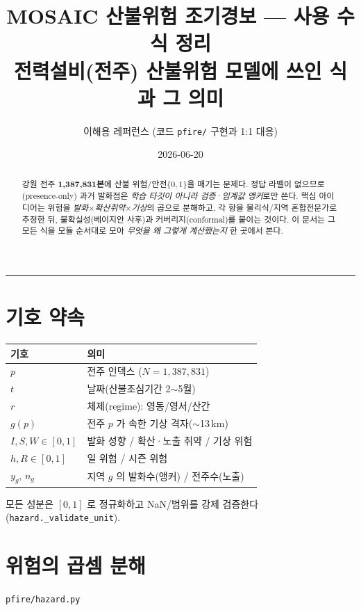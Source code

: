 \documentclass[11pt,a4paper]{article}
\title{\textbf{MOSAIC 산불위험 조기경보 — 사용 수식 정리}\\[4pt]
\large 전력설비(전주) 산불위험 모델에 쓰인 식과 그 의미}
\author{이해용 레퍼런스 (코드 \texttt{pfire/} 구현과 1:1 대응)}
\date{2026-06-20}
\newcommand{\src}[1]{{\footnotesize\color{gray}\texttt{#1}}}
\begin{document}
\maketitle

\begin{abstract}
\noindent
강원 전주 \textbf{1,387,831본}에 산불 위험/안전$\{0,1\}$을 매기는 문제다. 정답 라벨이
없으므로(presence-only) 과거 발화점은 \emph{학습 타깃이 아니라 검증·임계값 앵커}로만
쓴다. 핵심 아이디어는 위험을 \emph{발화}$\times$\emph{확산취약}$\times$\emph{기상}의
곱으로 분해하고, 각 항을 물리식/지역 혼합전문가로 추정한 뒤, 불확실성(베이지안 사후)과
커버리지(conformal)를 붙이는 것이다. 이 문서는 그 모든 식을 모듈 순서대로 모아
\emph{무엇을 왜 그렇게 계산했는지} 한 곳에서 본다.
\end{abstract}

\tableofcontents
\vspace{6pt}\hrule

\section{기호 약속}
\begin{tabular}{ll}
\toprule
기호 & 의미 \\
\midrule
$p$ & 전주 인덱스 ($N=1{,}387{,}831$) \\
$t$ & 날짜(산불조심기간 2$\sim$5월) \\
$r$ & 체제(regime): 영동/영서/산간 \\
$g(p)$ & 전주 $p$ 가 속한 기상 격자($\sim$13\,km) \\
$I,S,W\in[0,1]$ & 발화 성향 / 확산·노출 취약 / 기상 위험 \\
$h,R\in[0,1]$ & 일 위험 / 시즌 위험 \\
$y_g,\,n_g$ & 지역 $g$ 의 발화수(앵커) / 전주수(노출) \\
\bottomrule
\end{tabular}

모든 성분은 $[0,1]$ 로 정규화하고 NaN/범위를 강제 검증한다(\src{hazard.\_validate\_unit}).

\section{위험의 곱셈 분해}
\src{pfire/hazard.py}
\end{document}
